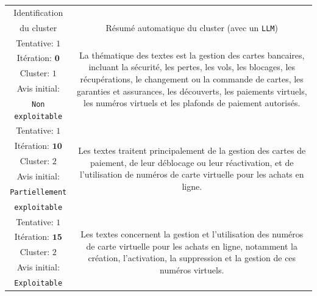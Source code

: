 			\begin{table}[!htb]
				\begin{center}
				\def\arraystretch{0.8}  %
				\begin{tabular}{|c|c|}
				
				\hline
				\rowcolor{colorTableHeader!15}
				Identification
					& 
					\tabularnewline
				\rowcolor{colorTableHeader!15}
				du cluster
					& \multirow{-2}{*}{
						Résumé automatique du cluster (avec un \texttt{LLM})
					}
					\tabularnewline
					\hline \hline

				{ \footnotesize Tentative: $1$ }
					& \multirow{5}{*}{\parbox{12cm}{
						\footnotesize La thématique des textes est la gestion des cartes bancaires, incluant la sécurité, les pertes, les vols, les blocages, les récupérations, le changement ou la commande de cartes, les garanties et assurances, les découverts, les paiements virtuels, les numéros virtuels et les plafonds de paiement autorisés.
					}}
					\tabularnewline
				{ \footnotesize Itération: $\textbf{0}$ }
					&
					\tabularnewline
				{ \footnotesize Cluster: $1$ }
					&
					\tabularnewline
				{ \footnotesize Avis initial: }
					&
					\tabularnewline
				{ \footnotesize \color{colorDarkPastelRed} \texttt{Non exploitable} }
					&
					\tabularnewline
					\hline
					
				{ \footnotesize Tentative: $1$ }
					& \multirow{6}{*}{\parbox{12cm}{
						\footnotesize Les textes traitent principalement de la gestion des cartes de paiement, de leur déblocage ou leur réactivation, et de l'utilisation de numéros de carte virtuelle pour les achats en ligne.
					}}
					\tabularnewline
				{ \footnotesize Itération: $\textbf{10}$ }
					&
					\tabularnewline
				{ \footnotesize Cluster: $2$ }
					&
					\tabularnewline
				{ \footnotesize Avis initial: }
					&
					\tabularnewline
				{ \footnotesize \color{colorCarrotOrange} \texttt{Partiellement} }
					&
					\tabularnewline
				{ \footnotesize \color{colorCarrotOrange} \texttt{exploitable} }
					&
					\tabularnewline
					\hline
					
				{ \footnotesize Tentative: $1$ }
					& \multirow{5}{*}{\parbox{12cm}{
						\footnotesize Les textes concernent la gestion et l'utilisation des numéros de carte virtuelle pour les achats en ligne, notamment la création, l'activation, la suppression et la gestion de ces numéros virtuels.
					}}
					\tabularnewline
				{ \footnotesize Itération: $\textbf{15}$ }
					&
					\tabularnewline
				{ \footnotesize Cluster: $2$ }
					&
					\tabularnewline
				{ \footnotesize Avis initial: }
					&
					\tabularnewline
				{ \footnotesize \color{colorDarkPastelGreen} \texttt{Exploitable} }
					&
					\tabularnewline
				

\end{tabular}
\end{center}
\end{table}
